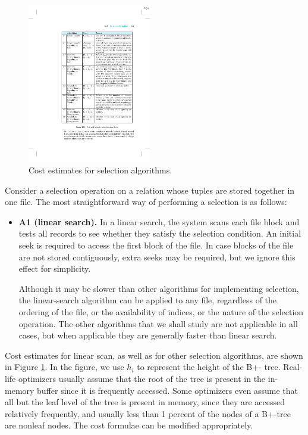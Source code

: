 \documentclass{vldb}
\newcommand{\bi}{\begin{itemize}}
\newcommand{\ei}{\end{itemize}}
\newcommand{\ii}{\item}
\begin{document}
\begin{figure}[htb]
\centering
\includegraphics[width=0.48\textwidth]{selection_algorithms}
\caption{Cost estimates for selection algorithms.}
\label{fig:cost}
\end{figure}

Consider a selection operation on a relation whose tuples are stored together in one file. 
The most straightforward way of performing a selection is as follows:
\bi
\ii \textbf{A1 (linear search).} In a linear search, the system scans each file block and
tests all records to see whether they satisfy the selection condition. An initial
seek is required to access the first block of the file. In case blocks of the file
are not stored contiguously, extra seeks may be required, but we ignore this
effect for simplicity.

Although it may be slower than other algorithms for implementing selection,
the linear-search algorithm can be applied to any file, regardless of the
ordering of the file, or the availability of indices, or the nature of the selection
operation. The other algorithms that we shall study are not applicable in all
cases, but when applicable they are generally faster than linear search.
\ei

Cost estimates for linear scan, as well as for other selection algorithms, are
shown in Figure \ref{fig:cost}. In the figure, we use $h_i$ to represent the height of the B+-
tree. Real-life optimizers usually assume that the root of the tree is present in the
in-memory buffer since it is frequently accessed. Some optimizers even assume
that all but the leaf level of the tree is present in memory, since they are accessed
relatively frequently, and usually less than 1 percent of the nodes of a B+-tree are
nonleaf nodes. The cost formulae can be modified appropriately.
\end{document}
